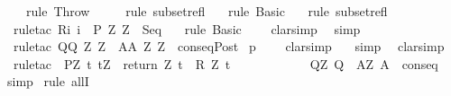 \begin{isabellebody}
\isamarkupfalse%
\ \ \ \ {\isacharparenleft}rule\ Throw{\isacharparenright}\ \isanewline
{}\isamarkupfalse%
\ \ \ \ {\isacharparenleft}rule\ subset{\isacharunderscore}refl{\isacharparenright}\isanewline
{}\isamarkupfalse%
\ \ \ {\isacharparenleft}rule\ Basic{\isacharparenright}\isanewline
{}\isamarkupfalse%
\ \ \ {\isacharparenleft}rule\ subset{\isacharunderscore}refl{\isacharparenright}\isanewline
{}\isamarkupfalse%
\ \ {\isacharparenleft}rule{\isacharunderscore}tac\ R{\isacharequal}{\isachardoublequoteopen}{\isacharbraceleft}i{\isachardot}\ i\ {\isasymin}\ P{\isacharprime}\ Z\ Z{\isacharprime}{\isacharbraceright}{\isachardoublequoteclose}\ \ Seq{\isacharparenright}\isanewline
{}\isamarkupfalse%
\ \ \ {\isacharparenleft}rule\ Basic{\isacharparenright}\ \isanewline
{}\isamarkupfalse%
\ \ \ clarsimp\isanewline
{}\isamarkupfalse%
\ \ simp\isanewline
{}\isamarkupfalse%
\ \ {\isacharparenleft}rule{\isacharunderscore}tac\ Q{\isacharprime}{\isacharequal}{\isachardoublequoteopen}Q{\isacharprime}\ Z\ Z{\isacharprime}{\isachardoublequoteclose}\ \ A{\isacharprime}{\isacharequal}{\isachardoublequoteopen}A{\isacharprime}\ Z\ Z{\isacharprime}{\isachardoublequoteclose}\ \ conseqPost{\isacharparenright}\isanewline
{}\isamarkupfalse%
\ p\isanewline
{}\isamarkupfalse%
\ \ \ \ clarsimp\isanewline
{}\isamarkupfalse%
\ \ \ simp\isanewline
{}\isamarkupfalse%
\ \ clarsimp\isanewline
{}\isamarkupfalse%
\ \ {\isacharparenleft}rule{\isacharunderscore}tac\ \ P{\isacharprime}{\isacharequal}{\isachardoublequoteopen}{\isasymlambda}Z{\isacharprime}{\isacharprime}{\isachardot}\ {\isacharbraceleft}t{\isachardot}\ t{\isacharequal}Z{\isacharprime}{\isacharprime}\ {\isasymand}\ return\ Z\ t\ {\isasymin}\ R\ Z\ t{\isacharbraceright}{\isachardoublequoteclose}\ \ \isanewline
\ \ \ \ \ \ \ \ \ \ Q{\isacharprime}{\isacharequal}{\isachardoublequoteopen}{\isasymlambda}Z{\isacharprime}{\isacharprime}{\isachardot}\ Q{\isachardoublequoteclose}\ \ A{\isacharprime}{\isacharequal}{\isachardoublequoteopen}{\isasymlambda}Z{\isacharprime}{\isacharprime}{\isachardot}\ A{\isachardoublequoteclose}\ \ conseq{\isacharparenright}\isanewline
{}\isamarkupfalse%
\ {}\ \isamarkupfalse%
\ simp\isanewline
{}\isamarkupfalse%
\ {\isacharparenleft}rule\ allI{\isacharparenright}\isanewline

\end{isabellebody}
